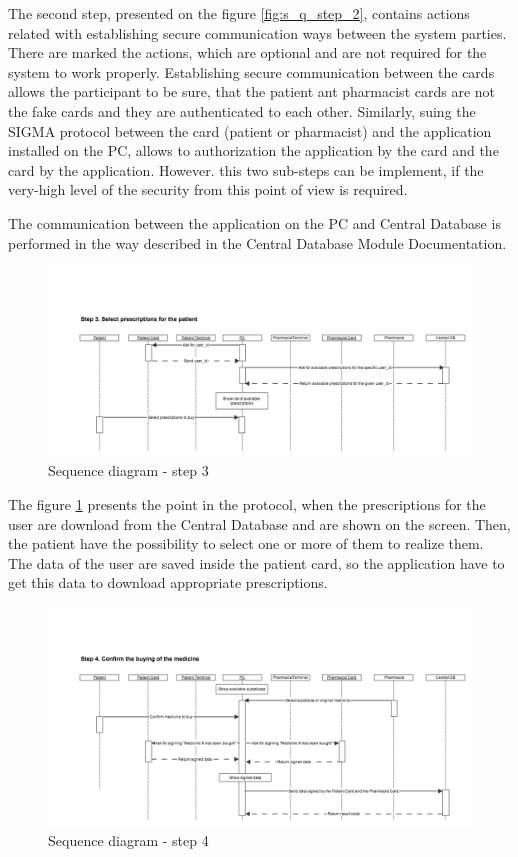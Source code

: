 The second step, presented on the figure \ref{fig:s_q_step_2}, contains actions related with establishing secure communication ways between the system parties. There are marked the actions, which are optional and are not required for the system to work properly. Establishing secure communication between the cards allows the participant to be sure, that the patient ant pharmacist cards are not the fake cards and they are authenticated to each other.
Similarly, suing the SIGMA protocol between the card (patient or pharmacist) and the application installed on the PC, allows to authorization the application by the card and the card by the application. However. this two sub-steps can be implement, if the very-high level of the security from this point of view is required. 

The communication between the application on the PC and Central Database is performed in the way described in the Central Database Module Documentation.

\begin{figure}	
	\hspace*{-1.5in}
    \includegraphics[scale=0.45]{s_d_3.png}
    \caption{Sequence diagram - step 3}
    \label{fig:s_q_step_3}
\end{figure} 

The figure \ref{fig:s_q_step_3} presents the point in the protocol, when the prescriptions for the user are download from the Central Database and are shown on the screen. Then, the patient have the possibility to select one or more of them to realize them. The data of the user are saved inside the patient card, so the application have to get this data to download appropriate prescriptions. 


\begin{figure}	
	\hspace*{-1.5in}
    \includegraphics[scale=0.45]{s_d_4.png}
    \caption{Sequence diagram - step 4}
    \label{fig:s_q_step_4}
\end{figure} 

